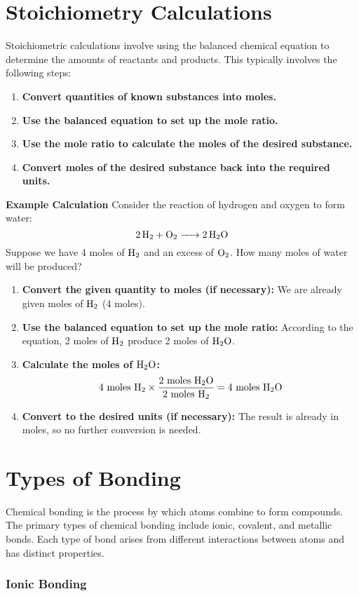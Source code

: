 \documentclass[10pt, roman]{article}
\begin{document}
\section{Stoichiometry Calculations}
Stoichiometric calculations involve using the balanced chemical equation to determine the amounts of reactants and products. This typically involves the following steps:
\begin{enumerate}
    \item \textbf{Convert quantities of known substances into moles.}
    \item \textbf{Use the balanced equation to set up the mole ratio.}
    \item \textbf{Use the mole ratio to calculate the moles of the desired substance.}
    \item \textbf{Convert moles of the desired substance back into the required units.}
\end{enumerate}
\textbf{Example Calculation}
Consider the reaction of hydrogen and oxygen to form water:
\[
\ce{2H2 + O2 -> 2H2O}
\]
Suppose we have 4 moles of \(\ce{H2}\) and an excess of \(\ce{O2}\). How many moles of water will be produced?
\begin{enumerate}
    \item \textbf{Convert the given quantity to moles (if necessary):}
    We are already given moles of \(\ce{H2}\) (4 moles).
    \item \textbf{Use the balanced equation to set up the mole ratio:}
    According to the equation, 2 moles of \(\ce{H2}\) produce 2 moles of \(\ce{H2O}\).
    \item \textbf{Calculate the moles of \(\ce{H2O}\):}
    \[
    4 \text{ moles } \ce{H2} \times \frac{2 \text{ moles } \ce{H2O}}{2 \text{ moles } \ce{H2}} = 4 \text{ moles } \ce{H2O}
    \]
    \item \textbf{Convert to the desired units (if necessary):}
    The result is already in moles, so no further conversion is needed.
\end{enumerate}
\section{Types of Bonding}
Chemical bonding is the process by which atoms combine to form compounds.
The primary types of chemical bonding include ionic, covalent, and metallic bonds.
Each type of bond arises from different interactions between atoms and has distinct properties.

\subsubsection*{Ionic Bonding}
\end{document}
